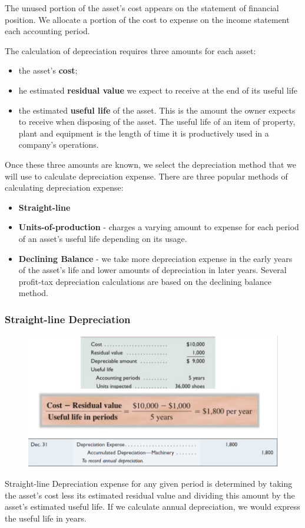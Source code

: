 \documentclass[../main.tex]{subfiles}
\begin{document}
	The unused portion of the asset’s cost appears on the statement of 
	financial position. We allocate a portion of the cost to expense on the 
	income statement each accounting period.
	
	The calculation of depreciation requires three amounts for each asset:
	\begin{itemize}[noitemsep]
		\item the asset’s \textbf{cost};
		\item he estimated \textbf{residual value} we expect to receive at the 
		end of its useful life
		\item the estimated \textbf{useful life} of the asset. This is the 
		amount the owner expects to receive when disposing of the asset. The 
		useful life of an item of property, plant and equipment is the length 
		of time it is productively used in a company’s operations.
	\end{itemize}
	 Once these three amounts are known, we select the depreciation method that 
	 we will use to calculate depreciation expense. There are three popular 
	 methods of calculating depreciation expense:
	 \begin{itemize}[noitemsep]
	 	\item \textbf{Straight-line}
	 	\item \textbf{Units-of-production} - charges a varying amount to 
	 	expense for each period of an asset’s useful life depending on its 
	 	usage.
	 	\item \textbf{Declining Balance} - we take more depreciation expense in 
	 	the early years of the asset’s life and lower amounts of depreciation 
	 	in later years. Several profit-tax depreciation calculations are based 
	 	on the declining balance method. 
	 \end{itemize}
	 
	\subsubsection{Straight-line Depreciation}
	\begin{figure}[ht!]
		\centering		
		\includegraphics[width=\columnwidth]{images/c8/straight_line_eg.png}
	\end{figure}
	Straight-line Depreciation expense for any given period is determined by 
	taking the asset’s cost less its estimated residual value and dividing this 
	amount by 
	the asset’s estimated useful life. If we calculate annual depreciation, we 
	would express the useful life in years.
	
\end{document}

